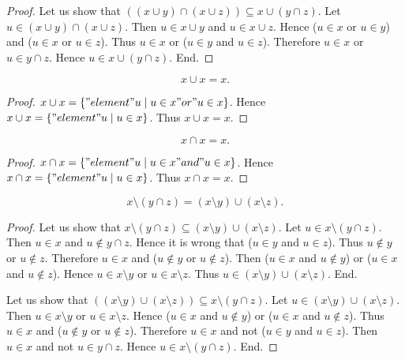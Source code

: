 \documentclass[../../sets-and-functions.ftl.tex]{subfiles}
\begin{document}
\begin{forthel}
\begin{proof}
      Let us show that $((x \cup y) \cap (x \cup z)) \subseteq x \cup (y \cap z)$.
        Let $u \in (x \cup y) \cap (x \cup z)$.
        Then $u \in x \cup y$ and $u \in x \cup z$.
        Hence ($u \in x$ or $u \in y$) and ($u \in x$ or $u \in z$).
        Thus $u \in x$ or ($u \in y$ and $u \in z$).
        Therefore $u \in x$ or $u \in y \cap z$.
        Hence $u \in x \cup (y \cap z)$.
      End.
    \end{proof}

    \begin{proposition}[SF 01 01  496190]
      $$x \cup x = x.$$
    \end{proposition}
    \begin{proof}
      $x \cup x = \{ "element" u \mid u \in x "or" u \in x \}$.
      Hence $x \cup x = \{ "element" u \mid u \in x \}$.
      Thus $x \cup x = x$.
    \end{proof}


    \begin{proposition}[SF 01 01 783425]
      $$x \cap x = x.$$
    \end{proposition}
    \begin{proof}
      $x \cap x = \{ "element" u \mid u \in x "and" u \in x \}$.
      Hence $x \cap x = \{ "element" u \mid u \in x \}$.
      Thus $x \cap x = x$.
    \end{proof}

    \begin{proposition}[SF 01 01 339365]
      $$x \setminus (y \cap z) = (x \setminus y) \cup (x \setminus z).$$
    \end{proposition}
    \begin{proof}
      Let us show that $x \setminus (y \cap z) \subseteq (x \setminus y) \cup
      (x \setminus z)$.
        Let $u \in x \setminus (y \cap z)$.
        Then $u \in x$ and $u \notin y \cap z$.
        Hence it is wrong that ($u \in y$ and $u \in z$).
        Thus $u \notin y$ or $u \notin z$.
        Therefore $u \in x$ and ($u \notin y$ or $u \notin z$).
        Then ($u \in x$ and $u \notin y$) or ($u \in x$ and $u \notin z$).
        Hence $u \in x \setminus y$ or $u \in x \setminus z$.
        Thus $u \in (x \setminus y) \cup (x \setminus z)$.
      End.

      Let us show that $((x \setminus y) \cup (x \setminus z)) \subseteq
      x \setminus (y \cap z)$.
        Let $u \in (x \setminus y) \cup (x \setminus z)$.
        Then $u \in x \setminus y$ or $u \in x \setminus z$.
        Hence ($u \in x$ and $u \notin y$) or ($u \in x$ and $u \notin z$).
        Thus $u \in x$ and ($u \notin y$ or $u \notin z$).
        Therefore $u \in x$ and not ($u \in y$ and $u \in z$).
        Then $u \in x$ and not $u \in y \cap z$.
        Hence $u \in x \setminus (y \cap z)$.
      End.
    \end{proof}



\end{forthel}
\end{document}
